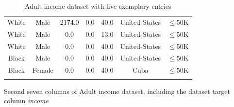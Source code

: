 \begin{table}[h]
\begin{subtable}{\textwidth}
{\begin{tabular}{|c|c|c|c|c|c|c|}
                White         & Male         & 2174.0                & 0.0                   & 40.0                    & United-States           & $\leq$50K       \\
                White         & Male         & 0.0                   & 0.0                   & 13.0                    & United-States           & $\leq$50K       \\
                White         & Male         & 0.0                   & 0.0                   & 40.0                    & United-States           & $\leq$50K       \\
                Black         & Male         & 0.0                   & 0.0                   & 40.0                    & United-States           & $\leq$50K       \\
                Black         & Female       & 0.0                   & 0.0                   & 40.0                    & Cuba                    & $\leq$50K       \\
                \bottomrule
				\multicolumn{7}{c}{}\\[-0.6em]
            \end{tabular}
        }
        \caption{Second seven columns of Adult income dataset, including the dataset target column \textit{income}}
        \label{subtab:adult2}
    \end{subtable}
	\caption[Example Adult Dataset]{Adult income dataset with five exemplary entries}
	\label{tab:adult}
\end{table}

